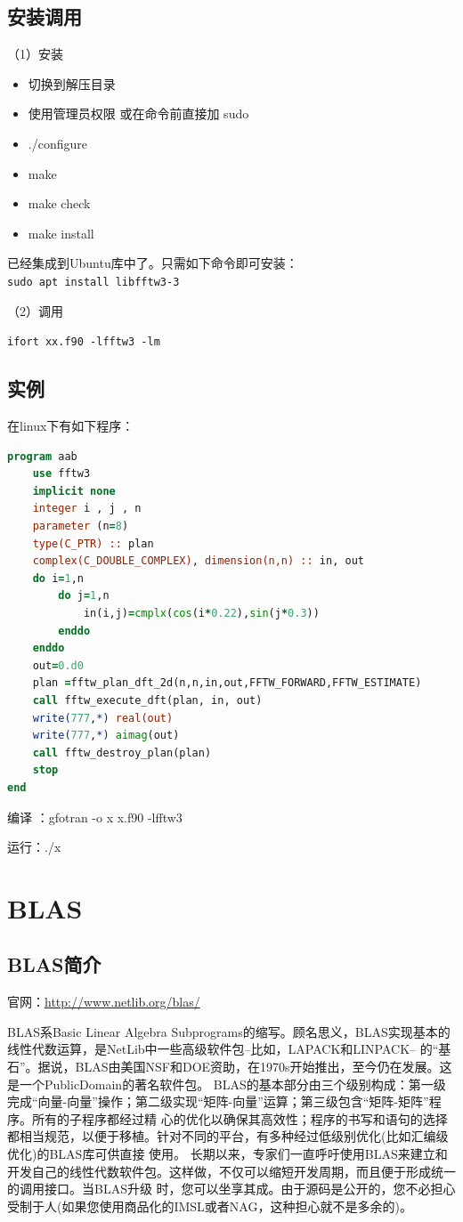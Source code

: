\subsection{安装调用}
（1）安装
\begin{itemize}
\item 切换到解压目录
\item 使用管理员权限 或在命令前直接加 sudo
\item ./configure
\item make
\item make check
\item make install
\end{itemize}

已经集成到Ubuntu库中了。只需如下命令即可安装：\\
\verb|sudo apt install libfftw3-3|

（2）调用

\verb*|ifort xx.f90 -lfftw3 -lm|


\subsection{实例}
在linux下有如下程序：
\begin{lstlisting}[language=Fortran]
program aab
	use fftw3
	implicit none 
	integer i , j , n
	parameter (n=8)
	type(C_PTR) :: plan
	complex(C_DOUBLE_COMPLEX), dimension(n,n) :: in, out
	do i=1,n
		do j=1,n
			in(i,j)=cmplx(cos(i*0.22),sin(j*0.3))
		enddo
	enddo
	out=0.d0
	plan =fftw_plan_dft_2d(n,n,in,out,FFTW_FORWARD,FFTW_ESTIMATE)
	call fftw_execute_dft(plan, in, out)
	write(777,*) real(out)
	write(777,*) aimag(out)
	call fftw_destroy_plan(plan)
	stop
end
\end{lstlisting}

编译 ：gfotran -o x   x.f90 -lfftw3

运行：./x


\section{BLAS}
\subsection{BLAS简介}
官网：\url{http://www.netlib.org/blas/}

BLAS系Basic Linear Algebra Subprograms的缩写。顾名思义，BLAS实现基本的线性代数运算，是NetLib中一些高级软件包--比如，LAPACK和LINPACK-- 的“基石”。据说，BLAS由美国NSF和DOE资助，在1970s开始推出，至今仍在发展。这是一个PublicDomain的著名软件包。
     BLAS的基本部分由三个级别构成：第一级完成“向量-向量”操作；第二级实现“矩阵-向量”运算；第三级包含“矩阵-矩阵”程序。所有的子程序都经过精 心的优化以确保其高效性；程序的书写和语句的选择都相当规范，以便于移植。针对不同的平台，有多种经过低级别优化(比如汇编级优化)的BLAS库可供直接 使用。
     长期以来，专家们一直呼吁使用BLAS来建立和开发自己的线性代数软件包。这样做，不仅可以缩短开发周期，而且便于形成统一的调用接口。当BLAS升级 时，您可以坐享其成。由于源码是公开的，您不必担心受制于人(如果您使用商品化的IMSL或者NAG，这种担心就不是多余的)。



